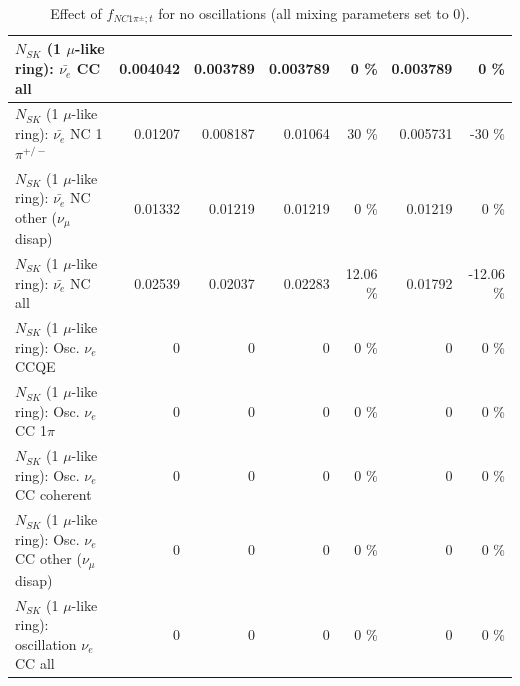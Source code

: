 \begin{table}
\begin{tabular}{| l | r | r | r  r | r  r |}
                            $N_{SK}$ (1 $\mu$-like ring): $\bar{\nu_{e}}$ CC all &        0.004042 &        0.003789 &        0.003789 &        0 \%  &        0.003789 &        0 \%  \\ 
\hline
                     $N_{SK}$ (1 $\mu$-like ring): $\bar{\nu_e}$ NC 1$\pi^{+/-}$ &         0.01207 &        0.008187 &         0.01064 &       30 \%  &        0.005731 &      -30 \%  \\ 
          $N_{SK}$ (1 $\mu$-like ring): $\bar{\nu_e}$ NC other ($\nu_\mu$ disap) &         0.01332 &         0.01219 &         0.01219 &        0 \%  &         0.01219 &        0 \%  \\ 
                            $N_{SK}$ (1 $\mu$-like ring): $\bar{\nu_{e}}$ NC all &         0.02539 &         0.02037 &         0.02283 &    12.06 \%  &         0.01792 &   -12.06 \%  \\ 
\hline
\hline
\hline
                                 $N_{SK}$ (1 $\mu$-like ring): Osc. $\nu_e$ CCQE &               0 &               0 &               0 &        0 \%  &               0 &        0 \%  \\ 
                            $N_{SK}$ (1 $\mu$-like ring): Osc. $\nu_e$ CC 1$\pi$ &               0 &               0 &               0 &        0 \%  &               0 &        0 \%  \\ 
                          $N_{SK}$ (1 $\mu$-like ring): Osc. $\nu_e$ CC coherent &               0 &               0 &               0 &        0 \%  &               0 &        0 \%  \\ 
           $N_{SK}$ (1 $\mu$-like ring): Osc. $\nu_e$ CC other ($\nu_\mu$ disap) &               0 &               0 &               0 &        0 \%  &               0 &        0 \%  \\ 
                        $N_{SK}$ (1 $\mu$-like ring): oscillation $\nu_e$ CC all &               0 &               0 &               0 &        0 \%  &               0 &        0 \%  \\ 
\hline
\hline
\end{tabular}
\caption{ Effect of $f_{NC1\pi^\pm; t}$ for no oscillations (all mixing parameters set to 0). }
\label{tab:num_xsec_norm_nc1piC_1RmuT_3f_osc_t13:0}
\end{table}
\clearpage
